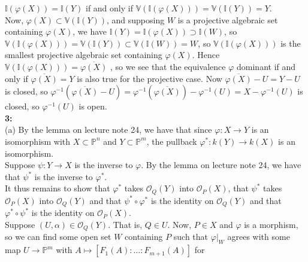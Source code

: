 \documentclass[a4paper]{article}
\begin{document}
 $\mathbb{I} \left( \varphi (X) \right) = \mathbb{I}(Y)$
 if and only if $
 \mathbb{V} \left( \mathbb{I} \left( \varphi(X) \right)  \right) 
 = \mathbb{V} \left( \mathbb{I}\left( Y \right)  \right) 
 = Y$.\\
 Now, $\varphi(X) \subset \mathbb{V}\left( \mathbb{I}\left( Y \right)  \right)
 $, and supposing $W$ is a projective algebraic set containing
 $\varphi(X)$, we have
 $\mathbb{I}(Y) = \mathbb{I}\left( \varphi(X) \right) \supset
 \mathbb{I}(W)$, so
 $\mathbb{V}\left( \mathbb{I}\left( 
 \varphi(X) \right)  \right) =  \mathbb{V} \left( \mathbb{I}(Y) \right) 
 \subset  \mathbb{V}\left( \mathbb{I}\left( W \right)  \right) 
 = W$, so $\mathbb{V} \left( \mathbb{I}\left( \varphi(X) \right)  \right) $ 
 is the smallest projective algebraic set containing
 $\varphi(X)$. Hence
 $\mathbb{V} \left( \mathbb{I}\left( \varphi(X) \right)  \right) 
 = \overline{\varphi(X)}$
 , so we see that the equivalence
 $\varphi$ dominant if and only if
 $\overline{\varphi (X)} = Y$ is also true for the projective case.
 Now $\overline{\varphi(X)}- U =  Y - U$ is closed,
 so $\varphi^{-1}
 \left( \overline{\varphi(X)}- U \right) 
= \varphi^{-1} \left( \overline{\varphi(X)} \right) 
 - \varphi^{-1}(U)
 = X - \varphi^{-1}(U)$ is closed, so
 $\varphi^{-1}(U)$ is open.\\
 \linebreak
 \textbf{3:}\\
 (a) By the lemma on lecture note 24, we have that since
 $\varphi  \colon X \to Y$ is an isomorphism
 with $X \subset \mathbb{P}^{n}$ and
 $Y \subset \mathbb{P}^{m}$, the pullback
 $\varphi^{*}  \colon k(Y) \to k(X)$ is an isomorphism.\\
 Suppose $\psi  \colon Y \to X$ is the inverse to $\varphi$. By the lemma on
 lecture note 24, we have that  $\psi^{*}$ is the inverse to $\varphi^{*}$.\\
 It thus remains to show that $\varphi^{*}$ takes 
 $\mathcal{O}_Q (Y)$ into $\mathcal{O}_P(X)$, that
 $\psi^{*}$ takes $\mathcal{O}_P(X)$ into $\mathcal{O}_Q(Y)$ and
  that $\psi^{*} \circ \varphi^{*}$ is the identity on
  $\mathcal{O}_Q(Y)$ and that
  $\varphi^{*} \circ \psi^{*}$ is the identity on $\mathcal{O}_P(X)$.\\
  \linebreak
 Suppose $\left( U, \alpha \right) \in 
 \mathcal{O}_Q(Y)$. That is, $Q \in U$. Now, $P \in X$ and
 $\varphi$ is a morphism, so we can find some open set
 $W$ containing $P$ such that $\varphi|_W$ agrees with some map
 $U \to \mathbb{P}^{m}$ with
 $A \mapsto  \left[ F_1 (A) : \ldots : F_{m+1}(A) \right] $ for
\end{document}

